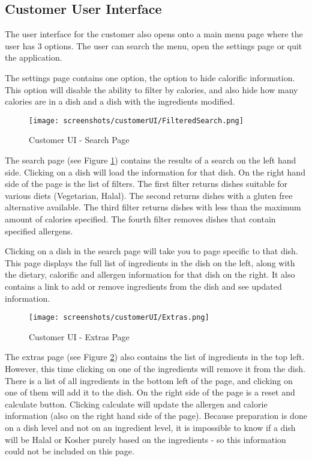 \subsection{Customer User Interface}

The user interface for the customer also opens onto a main menu page where the user has 3 options. The user can search the menu, open the settings page or quit the application.

The settings page contains one option, the option to hide calorific information. This option will disable the ability to filter by calories, and also hide how many calories are in a dish and a dish with the ingredients modified.

\begin{figure}[h]
    \centering
    \captionsetup{justification=centering}
    \texttt{[image: screenshots/customerUI/FilteredSearch.png]}
    \caption{Customer UI - Search Page}
    \label{fig:customerUI_search}
\end{figure}

The search page (see Figure \ref{fig:customerUI_search}) contains the results of a search on the left hand side. Clicking on a dish will load the information for that dish. On the right hand side of the page is the list of filters. The first filter returns dishes suitable for various diets (Vegetarian, Halal). The second returns dishes with a gluten free alternative available. The third filter returns dishes with less than the maximum amount of calories specified. The fourth filter removes dishes that contain specified allergens.

Clicking on a dish in the search page will take you to page specific to that dish. This page displays the full list of ingredients in the dish on the left, along with the dietary, calorific and allergen information for that dish on the right. It also contains a link to add or remove ingredients from the dish and see updated information.

\begin{figure}[h]
    \centering
    \captionsetup{justification=centering}
    \texttt{[image: screenshots/customerUI/Extras.png]}
    \caption{Customer UI - Extras Page}
    \label{fig:customerUI_extras}
\end{figure}

The extras page (see Figure \ref{fig:customerUI_extras}) also contains the list of ingredients in the top left. However, this time clicking on one of the ingredients will remove it from the dish. There is a list of all ingredients in the bottom left of the page, and clicking on one of them will add it to the dish. On the right side of the page is a reset and calculate button. Clicking calculate will update the allergen and calorie information (also on the right hand side of the page). Because preparation is done on a dish level and not on an ingredient level, it is impossible to know if a dish will be Halal or Kosher purely based on the ingredients - so this information could not be included on this page.

